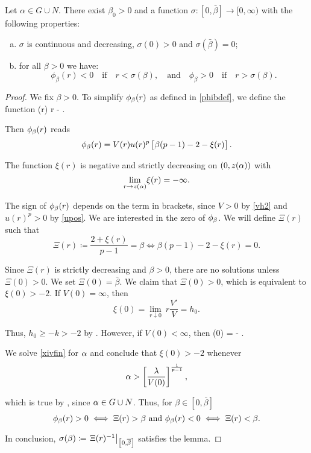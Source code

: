 \begin{lemma}\label{genlem4}
Let $\alpha \in G \cup N$. There exist $\beta_0 > 0$ and a function
$\sigma : [0, \bar\beta] \to [0, \infty)$ with the following properties:
\begin{enumerate}[(a)]
\item  $\sigma$ is continuous and decreasing, $\sigma(0) > 0$ and
$\sigma(\bar\beta) = 0$; 
\item for all $\beta > 0$ we have: 
\[
\phi_\beta(r) < 0 \quad \text{if} \quad r < \sigma(\beta), 
\quad \text{and} \quad
\phi_\beta > 0 \quad \text{if} \quad r > \sigma(\beta). 
\]
\end{enumerate}
\end{lemma}

\begin{proof}
We fix $\beta>0$. To simplify $\phi_{\beta}(r)$ as defined in \eqref{phibdef}, we
define the function
\be \label{xidef}
\xi(r) \coloneqq r  - .
\ee

Then $\phi_{\beta}(r)$ reads
\[ 
\phi_{\beta}(r) = V(r) u(r)^p \left[ \beta (p-1) - 2 - \xi(r) \right]. 
\]

The function $\xi(r)$ is negative and strictly decreasing on $(0, z(\alpha))$ with 
\[
\underset{r\to z(\alpha)}{\lim} \xi(r) = -\infty.
\]

The sign of $\phi_{\beta}(r)$ depends on the term in brackets, since $V > 0$ by
\eqref{vh2} and $u(r)^p > 0$ by \eqref{upos}. We are interested in the zero of
$\phi_{\beta}$. We will define $\Xi(r)$ such that 
\[ 
\Xi(r) \coloneqq \frac{2 + \xi(r)}{p - 1} = \beta
\iff \beta (p-1) - 2 - \xi(r) = 0.
\]

Since $\Xi(r)$ is strictly decreasing and $\beta > 0$, there are no solutions
unless $\Xi(0) > 0$.  We set $\Xi(0)=\bar\beta$. 
We claim that $\Xi(0) > 0$, which is equivalent to $\xi(0) > -2$. If $V(0) =
\infty$, then
\[ 
\xi(0) = \underset{r\downarrow 0}{\lim} ~ r\frac{V'}{V} = h_0.
\]

Thus, $h_0 \geq -k > -2$ by \cite[Remark 2.1]{gen11}. However, if $V(0) <
\infty$, then
\be \label{xivfin}
\xi(0) = - .
\ee

We solve \eqref{xivfin} for $\alpha$ and conclude that $\xi(0) > -2$ whenever 
\[ 
    \alpha > \left[\frac{\lambda}{V(0)}\right]^\frac{1}{p-1},
\]

which is true by , since $\alpha \in G\cup N$.  Thus, for $\beta \in
[0, \bar\beta]$
\[
    \phi_{\beta}(r) > 0 \iff \Xi(r) > \beta ~ \text{and} ~ 
    \phi_{\beta}(r) < 0 \iff \Xi(r) < \beta.
\]


In conclusion, $\sigma(\beta) \coloneqq \left. \Xi(r)^{-1} \right|_{\left[0,
\overline{\beta}\right]}$ satisfies the lemma.
\end{proof}
\newpage

